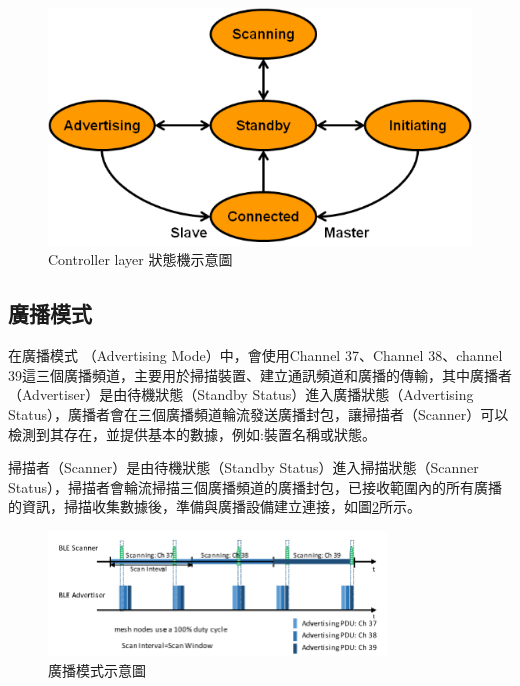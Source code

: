 \begin{ZhChapter}
\begin{figure}[H]
    \centering
    \includegraphics[width = 1\textwidth]{image/ble-link-layer-sm.png}
    \caption{Controller layer 狀態機示意圖\cite{microchip2023}}
    \label{fig: Controller layer 狀態機示意圖}
\end{figure}

\subsection{廣播模式}

在廣播模式 （Advertising Mode）中，會使用Channel 37、Channel 38、channel 39這三個廣播頻道，主要用於掃描裝置、建立通訊頻道和廣播的傳輸，其中廣播者（Advertiser）是由待機狀態（Standby Status）進入廣播狀態（Advertising Status），廣播者會在三個廣播頻道輪流發送廣播封包，讓掃描者（Scanner）可以檢測到其存在，並提供基本的數據，例如:裝置名稱或狀態。

掃描者（Scanner）是由待機狀態（Standby Status）進入掃描狀態（Scanner Status），掃描者會輪流掃描三個廣播頻道的廣播封包，已接收範圍內的所有廣播的資訊，掃描收集數據後，準備與廣播設備建立連接，如圖\ref{fig: 廣播模式示意圖}所示。
\begin{figure}[H]
    \centering
    \includegraphics[width = 0.8\textwidth]{image/廣播模式示意圖.png}
    \caption{廣播模式示意圖\cite{9035389}}
    \label{fig: 廣播模式示意圖}
\end{figure}


\end{ZhChapter}
